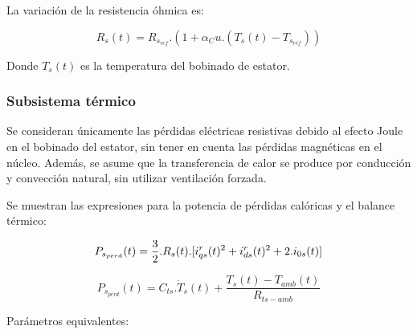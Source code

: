 \documentclass{article}
\begin{document}
    La variación de la resistencia óhmica es:

    \begin{equation}\label{termico3}
        R_s(t) = R_{s_{ref}}.(1+\alpha_Cu.(T_s(t)-T_{s_{ref}}))
    \end{equation}

    Donde $T_s(t)$ es la temperatura del bobinado de estator.
        
    \subsubsection{Subsistema térmico} 
    
    Se consideran únicamente las pérdidas eléctricas resistivas debido al efecto Joule en el bobinado del 
    estator, sin tener en cuenta las pérdidas magnéticas en el núcleo. Además, se asume que la 
    transferencia de calor se produce por conducción y convección natural, sin utilizar ventilación forzada.

    Se muestran las expresiones para la potencia de pérdidas calóricas y el 
    balance térmico:

    \begin{equation}\label{termico1}
        P_{s_{perd}}(t) =  \frac{3}{2}.R_{s}(t).[i_{qs}^r(t)^2+i_{ds}^r(t)^2+2.i_{0s}(t)]\\
    \end{equation}
    
    \begin{equation}\label{termico2}
        P_{s_{perd}}(t) = C_{ts}.\dot{T}_{s}(t) + \frac{T_{s}(t)-T_{amb}(t)}{R_{ts-amb}}
    \end{equation}

    \noindent Parámetros equivalentes:\\
\end{document}
